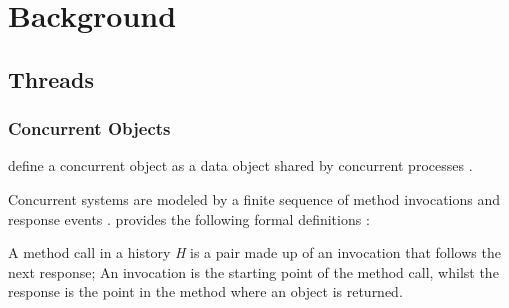 \chapter{Background}



\section{Threads}

\subsection{Concurrent Objects}
\textcite{herlihy1990linearizability} define a concurrent object as a data object shared by concurrent processes \cite{herlihy1990linearizability}. 

Concurrent systems are modeled by a finite sequence of method invocations and response events \cite[Chapter~3.6]{herlihy2020art}. \textcite{herlihy2020art} provides the following formal definitions \cite[Chapter~3.6]{herlihy2020art}:
\begin{definition}
A method call in a history \emph{H} is a pair made up of an invocation that follows the next response; An invocation is the starting point of the method call, whilst the response is the point in the method where an object is returned.
\end{definition}

